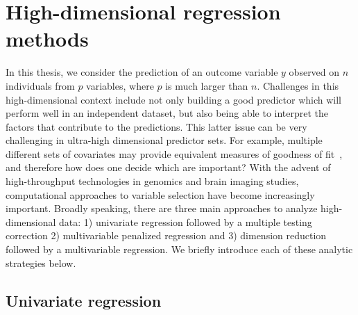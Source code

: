 \section{High-dimensional regression methods}

In this thesis, we consider the prediction of an outcome variable $y$ observed on $n$ individuals from $p$ variables, where $p$ is much larger than $n$. 
Challenges in this high-dimensional context include not only building a good predictor which will perform well in an independent dataset, but also being able to interpret the factors that contribute to the predictions. 
This latter issue can be very challenging in ultra-high dimensional predictor sets. 
For example, multiple different sets of covariates may provide equivalent measures of goodness of fit~\citep{fan2014challenges}, and therefore how does one decide which are important? 
With the advent of high-throughput technologies in genomics and brain imaging studies, computational approaches to variable selection have become increasingly important. 
Broadly speaking, there are three main approaches to analyze high-dimensional data: 1) univariate regression followed by a multiple testing correction 2) multivariable penalized regression and 3) dimension reduction followed by a multivariable regression. We briefly introduce each of these analytic strategies below.


\subsection{Univariate regression} \label{sec:single}

